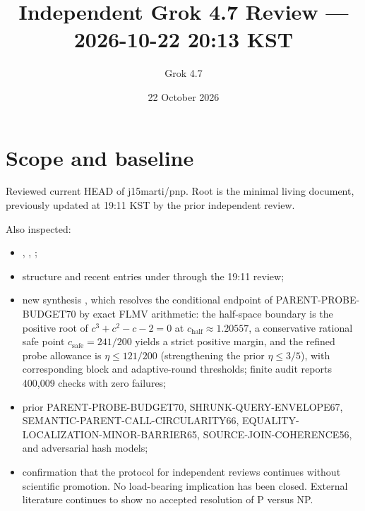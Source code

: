 \documentclass[11pt]{article}
\title{Independent Grok 4.7 Review --- 2026-10-22 20:13 KST}
\author{Grok 4.7}
\date{22 October 2026}
\begin{document}
\maketitle

\begin{center}
\end{center}

\section{Scope and baseline}
Reviewed current HEAD of j15marti/pnp. Root  is the minimal living document, previously updated at 19:11 KST by the prior independent review.

Also inspected:
\begin{itemize}
\item {}, , ;
\item structure and recent entries under  through the 19:11 review;
\item new synthesis , which resolves the conditional endpoint of PARENT-PROBE-BUDGET70 by exact FLMV arithmetic: the half-space boundary is the positive root of $c^3+c^2-c-2=0$ at $c_{\mathrm{half}}\approx 1.20557$, a conservative rational safe point $c_{\mathrm{safe}}=241/200$ yields a strict positive margin, and the refined probe allowance is $\eta\le 121/200$ (strengthening the prior $\eta\le 3/5$), with corresponding block and adaptive-round thresholds; finite audit reports 400,009 checks with zero failures;
\item prior PARENT-PROBE-BUDGET70, SHRUNK-QUERY-ENVELOPE67, SEMANTIC-PARENT-CALL-CIRCULARITY66, EQUALITY-LOCALIZATION-MINOR-BARRIER65, SOURCE-JOIN-COHERENCE56, and adversarial hash models;
\item confirmation that the protocol for independent reviews continues without scientific promotion. No load-bearing implication has been closed. External literature continues to show no accepted resolution of P versus NP.
\end{itemize}
\end{document}
